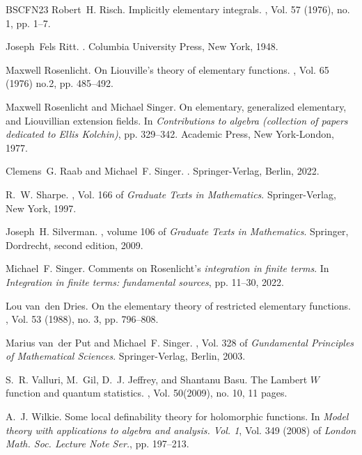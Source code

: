 \documentclass[12pt]{amsart}
\theoremstyle{definition}
\theoremstyle{plain}
\theoremstyle{exampstyle}\newtheorem{thmx}{Theorem}
\theoremstyle{exampstyle}\newtheorem{thmxbis}{Theorem}
\begin{document}
\begin{thebibliography}{BSCFN23}
Robert~H. Risch.
\newblock Implicitly elementary integrals.
, Vol. 57 (1976), no. 1, pp. 1--7.

Joseph~Fels Ritt.
.
\newblock Columbia University Press, New York, 1948.

Maxwell Rosenlicht.
\newblock On {L}iouville's theory of elementary functions.
, Vol. 65 (1976) no.2, pp. 485--492.

Maxwell Rosenlicht and Michael Singer.
\newblock On elementary, generalized elementary, and {L}iouvillian extension
  fields.
\newblock In {\em Contributions to algebra (collection of papers dedicated to
  {E}llis {K}olchin)}, pp. 329--342. Academic Press, New York-London, 1977.

Clemens~G. Raab and Michael~F. Singer.
.
\newblock Springer-Verlag, Berlin, 2022.

R.~W. Sharpe.
, Vol. 166 of {\em Graduate Texts in
  Mathematics}.
\newblock Springer-Verlag, New York, 1997.


Joseph~H. Silverman.
, volume 106 of {\em Graduate
  Texts in Mathematics}.
\newblock Springer, Dordrecht, second edition, 2009.

Michael~F. Singer.
\newblock Comments on {R}osenlicht's {\it {i}ntegration in finite terms}.
\newblock In {\em Integration in finite terms: fundamental sources}, pp. 11--30, 2022.

Lou van~den Dries.
\newblock On the elementary theory of restricted elementary functions.
, Vol. 53 (1988), no. 3, pp. 796--808.

Marius van~der Put and Michael~F. Singer.
, Vol. 328 of
  {\em Gundamental Principles of
  Mathematical Sciences}.
\newblock Springer-Verlag, Berlin, 2003.

S.~R. Valluri, M.~Gil, D.~J. Jeffrey, and Shantanu Basu.
\newblock The {L}ambert {$W$} function and quantum statistics.
, Vol. 50(2009), no. 10, 11 pages.

A.~J. Wilkie.
\newblock Some local definability theory for holomorphic functions.
\newblock In {\em Model theory with applications to algebra and analysis.
  {V}ol. 1}, Vol. 349 (2008) of {\em London Math. Soc. Lecture Note Ser.}, pp.
  197--213.

\end{thebibliography}

 
\end{document}
